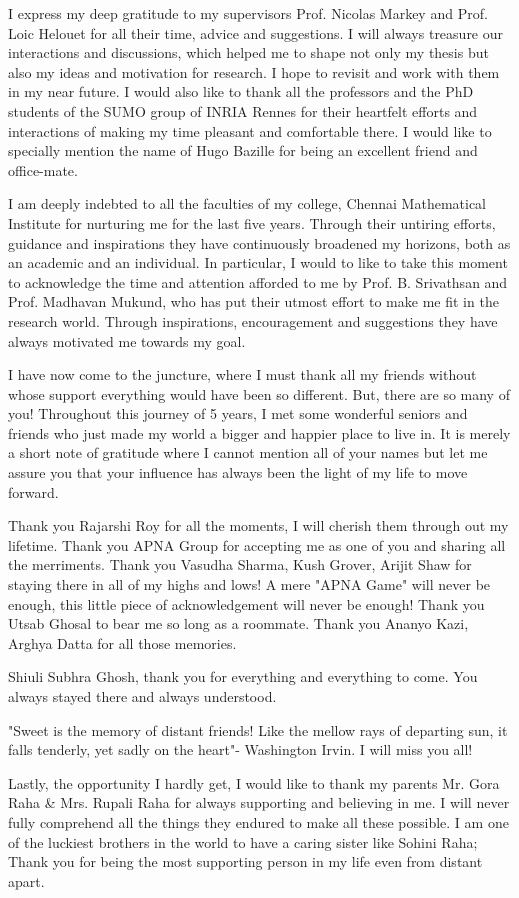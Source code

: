 I express my deep gratitude to my supervisors Prof. Nicolas Markey and Prof. Loic Helouet for all their time, advice and suggestions. I will always treasure our interactions and discussions, which helped me to shape not only my thesis but also my ideas and motivation for research. I hope to revisit and work with them in my near future. I would also like to thank all the professors and the PhD students of the SUMO group of INRIA Rennes for their heartfelt efforts and interactions of making my time pleasant and comfortable there. I would like to specially mention the name of Hugo Bazille for being an excellent friend and office-mate.
\vskip 0.2cm

I am deeply indebted to all the faculties of my college, Chennai Mathematical Institute for nurturing me for the last five years. Through their untiring efforts, guidance and inspirations they have continuously broadened my horizons, both as an academic and an individual. In particular, I would to like to take this moment to acknowledge the time and attention afforded to me by Prof. B. Srivathsan and Prof. Madhavan Mukund, who has put their utmost effort to make me fit in the research world. Through inspirations, encouragement and suggestions they have always motivated me towards my goal.
\vskip 0.2cm

I have now come to the juncture, where I must thank all my friends without whose support everything would have been so different. But, there are so many of you! Throughout this journey of 5 years, I met some wonderful seniors and friends who just made my world a bigger and happier place to live in. It is merely a short note of gratitude where I cannot mention all of your names but let me assure you that your influence has always been the light of my life to move forward.

Thank you Rajarshi Roy for all the moments, I will cherish them through out my lifetime. Thank you APNA Group for accepting me as one of you and sharing all the merriments. Thank you Vasudha Sharma, Kush Grover, Arijit Shaw for staying there in all of my highs and lows! A mere "APNA Game" will never be enough, this little piece of acknowledgement will never be enough! Thank you Utsab Ghosal to bear me so long as a roommate. Thank you Ananyo Kazi, Arghya Datta for all those memories. 

Shiuli Subhra Ghosh, thank you for everything and everything to come. You always stayed there and always understood.

"Sweet is the memory of distant friends! Like the mellow rays of departing sun, it falls tenderly, yet sadly on the heart"- Washington Irvin. I will miss you all!
\vskip 0.2cm

Lastly, the opportunity I hardly get, I would like to thank my parents Mr. Gora Raha \& Mrs. Rupali Raha for always supporting and believing in me. I will never fully comprehend all the things they endured to make all these possible. I am one of the luckiest brothers in the world to have a caring  sister like Sohini Raha; Thank you for being the most supporting person in my life even from distant apart.